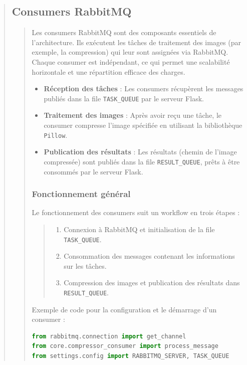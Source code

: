 \documentclass[12pt]{article}
\begin{document}
\begin{quote}
\subsection{Consumers RabbitMQ}
\begin{quote}

Les consumers RabbitMQ sont des composants essentiels de l'architecture. Ils exécutent les tâches de traitement des images (par exemple, la compression) qui leur sont assignées via RabbitMQ. Chaque consumer est indépendant, ce qui permet une scalabilité horizontale et une répartition efficace des charges. \\

\begin{itemize}
    \item \textbf{Réception des tâches} : Les consumers récupèrent les messages publiés dans la file \texttt{TASK\_QUEUE} par le serveur Flask.
    \item \textbf{Traitement des images} : Après avoir reçu une tâche, le consumer compresse l'image spécifiée en utilisant la bibliothèque \texttt{Pillow}.
    \item \textbf{Publication des résultats} : Les résultats (chemin de l'image compressée) sont publiés dans la file \texttt{RESULT\_QUEUE}, prêts à être consommés par le serveur Flask. \\
\end{itemize}

\subsubsection*{Fonctionnement général}
Le fonctionnement des consumers suit un workflow en trois étapes : \\
\begin{quote}
\begin{enumerate}
    \item Connexion à RabbitMQ et initialisation de la file \texttt{TASK\_QUEUE}.
    \item Consommation des messages contenant les informations sur les tâches.
    \item Compression des images et publication des résultats dans \texttt{RESULT\_QUEUE}.\\
\end{enumerate}
\end{quote}

Exemple de code pour la configuration et le démarrage d’un consumer : \\
\begin{lstlisting}[language=Python]
from rabbitmq.connection import get_channel
from core.compressor_consumer import process_message
from settings.config import RABBITMQ_SERVER, TASK_QUEUE


\end{lstlisting}
\end{quote}
\end{quote}
\end{document}
